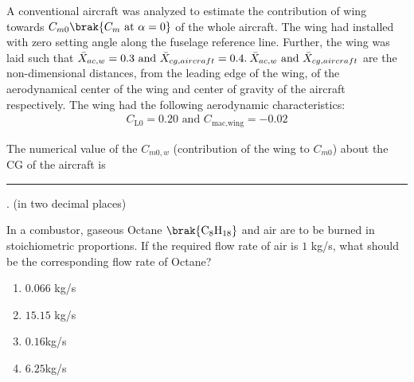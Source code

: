 \item A conventional aircraft was analyzed to estimate the contribution of wing towards $C_{m0}\brak{C_m \text{ at } \alpha=0}$ of the whole aircraft. The wing had installed with zero setting angle along the fuselage reference line. Further, the wing was laid such that $\Bar{X}_{ac,w}=0.3 \text{ and } \Bar{X}_{cg,aircraft}=0.4. \: \Bar{X}_{ac,w} \text{ and } \Bar{X}_{cg,aircraft}$ are the non-dimensional distances, from the leading edge of the wing, of the aerodynamical center of the wing and center of gravity of the aircraft respectively. The wing had the following aerodynamic characteristics:
\begin{align*}
    C_{\text{L0}} = 0.20 \text{ and }  C_{\text{mac,wing}} = -0.02
\end{align*}

 The numerical value of the $C_{m0,w}$ (contribution of the wing to $C_{m0}$) about the CG of the aircraft is \rule{1cm}{0.4 pt} . (in two decimal places)

\item In a combustor, gaseous Octane $\brak{\text{C}_8\text{H}_{18}}$ and air are to be burned in stoichiometric proportions. If the required flow rate of air is $1$ kg/s, what should be the corresponding flow rate of Octane?
\begin{multicols}{4}
\begin{enumerate}
\item $0.066$ kg/s
\item  $15.15$ kg/s
\item  $0.16 $kg/s
\item  $6.25 $kg/s
\end{enumerate}
\end{multicols}



